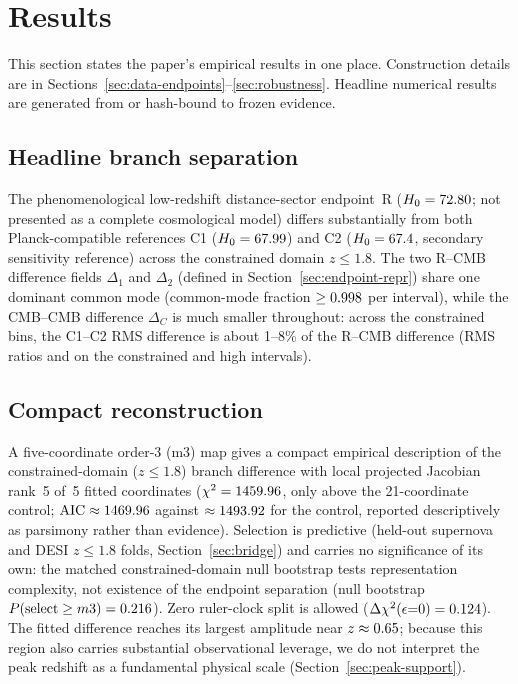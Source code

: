 \section{Results}
\label{sec:results}

This section states the paper's empirical results in one place.
Construction details are in
Sections~\ref{sec:data-endpoints}--\ref{sec:robustness}.
Headline numerical results are generated from or hash-bound to frozen evidence.

\subsection{Headline branch separation}

The phenomenological low-redshift distance-sector endpoint~R
($H_{0}=72.80$\kmsMpc{}; not presented as a complete cosmological model) differs substantially from both
Planck-compatible references C1 ($H_{0}=67.99$\kmsMpc{}) and
C2 ($H_{0}=67.4$\kmsMpc{}, secondary sensitivity reference) across the constrained domain
$z\le1.8$.
The two R--CMB difference fields
$\Delta_{1}$ and $\Delta_{2}$ (defined in Section~\ref{sec:endpoint-repr})
share one dominant common
mode (common-mode fraction $\ge0.998{}$ per
interval), while the CMB--CMB difference
$\Delta_{C}$ is much smaller throughout: across the constrained bins,
the C1--C2 RMS difference is about 1--8\% of the R--CMB difference
(RMS ratios \GeometryCmbRatioLow{} and
\GeometryCmbRatioHigh{} on the constrained and high intervals).

\subsection{Compact reconstruction}

A five-coordinate order-3 (m3) map gives a compact empirical
description of the constrained-domain ($z\le1.8$) branch difference with local projected Jacobian rank~5
of~5 fitted coordinates ($\chi^{2}=1459.96{}$, only \BridgeDeltaCtrl{} above the
21-coordinate control; $\mathrm{AIC}\approx1469.96{}$ against
$\approx1493.92{}$ for the control, reported descriptively as
parsimony rather than evidence). Selection is
predictive (held-out supernova and DESI $z\le1.8$ folds,
Section~\ref{sec:bridge}) and carries no significance of
its own: the matched constrained-domain null bootstrap tests representation complexity, not
existence of the endpoint separation (null bootstrap
$P(\mathrm{select}\ge m3)=0.216{}$).
Zero ruler-clock split is allowed
($\Delta\chi^{2}(\epsilon{=}0)=0.124{}$).
The fitted difference reaches its largest
amplitude near $z\approx0.65{}$; because this region also
carries substantial observational leverage, we do not interpret the
peak redshift as a fundamental physical scale
(Section~\ref{sec:peak-support}).

